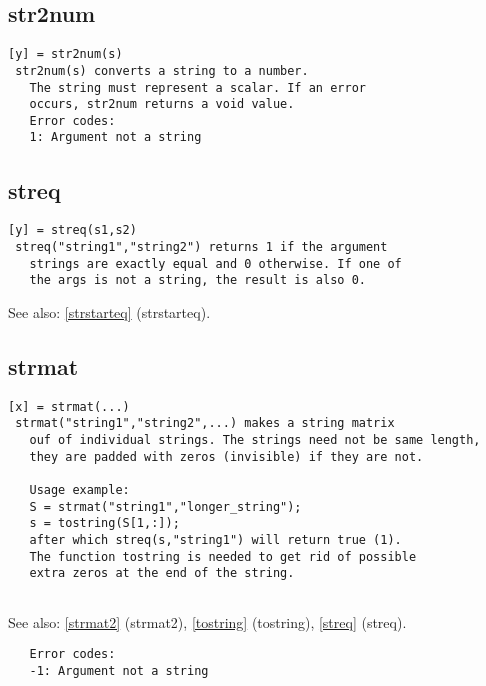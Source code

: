 \documentclass[a4paper]{article}
\begin{document}
\subsection{str2num\label{str2num}}

\begin{tscreen}
\begin{verbatim}
[y] = str2num(s)
 str2num(s) converts a string to a number.
   The string must represent a scalar. If an error
   occurs, str2num returns a void value.
   Error codes:
   1: Argument not a string 
\end{verbatim}
\end{tscreen}



\subsection{streq\label{streq}}

\begin{tscreen}
\begin{verbatim}
[y] = streq(s1,s2)
 streq("string1","string2") returns 1 if the argument
   strings are exactly equal and 0 otherwise. If one of
   the args is not a string, the result is also 0.
\end{verbatim}

See also: \ref{strstarteq} {(strstarteq)}.
\end{tscreen}



\subsection{strmat\label{strmat}}

\begin{tscreen}
\begin{verbatim}
[x] = strmat(...)
 strmat("string1","string2",...) makes a string matrix
   ouf of individual strings. The strings need not be same length,
   they are padded with zeros (invisible) if they are not.

   Usage example:
   S = strmat("string1","longer_string");
   s = tostring(S[1,:]);
   after which streq(s,"string1") will return true (1).
   The function tostring is needed to get rid of possible
   extra zeros at the end of the string.
   
\end{verbatim}

See also: \ref{strmat2} {(strmat2)}, \ref{tostring} {(tostring)}, \ref{streq} {(streq)}.
\begin{verbatim}
   Error codes:
   -1: Argument not a string
\end{verbatim}
\end{tscreen}
\end{document}
